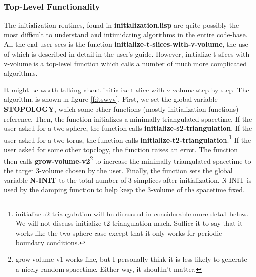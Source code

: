 \documentclass[12pt]{article}
\begin{document}
\subsubsection{Top-Level Functionality}
\label{s:initialization:top-level}
The initialization routines, found in \textbf{initialization.lisp} are
quite possibly the most difficult to understand and intimidating
algorithms in the entire code-base. All the end user sees is the
function \textbf{initialize-t-slices-with-v-volume}, the use of which
is described in detail in the user's guide. However,
initialize-t-slices-with-v-volume is a top-level function which calls
a number of much more complicated algorithms.

It might be worth talking about initialize-t-slice-with-v-volume step
by step. The algorithm is shown in figure \ref{f:itswvv}. First, we
set the global variable \textbf{STOPOLOGY}, which some other functions
(mostly initialization functions) reference. Then, the function
initializes a minimally triangulated spacetime. If the user asked for
a two-sphere, the function calls
\textbf{initialize-s2-triangulation}. If the user asked for a
two-torus, the function calls
\textbf{initialize-t2-triangulation}.\footnote{initialize-s2-triangulation
  will be discussed in considerable more detail below. We will not
  discuss initialize-t2-triangulation much. Suffice it to say that it
  works like the two-sphere case except that it only works for
  periodic boundary conditions.} If the user asked for some other
topology, the function raises an error. The function then calls
\textbf{grow-volume-v2}\footnote{grow-volume-v1 works fine, but I
  personally think it is less likely to generate a nicely random
  spacetime. Either way, it shouldn't matter.} to increase the
minimally triangulated spacetime to the target 3-volume chosen by the
user. Finally, the function sets the global variable \textbf{N-INIT}
to the total number of 3-simplices after initialization. N-INIT is
used by the damping function to help keep the 3-volume of the
spacetime fixed.
\end{document}
